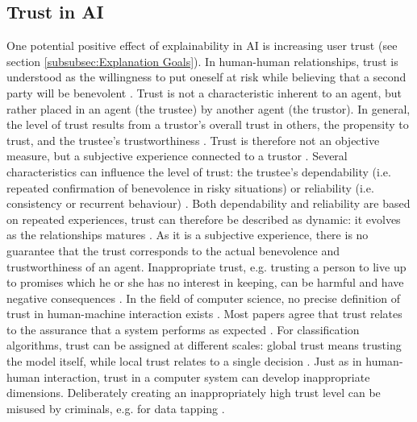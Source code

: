\subsection{Trust in AI}
One potential positive effect of explainability in AI is increasing user trust (see section \ref{subsubsec:Explanation Goals}). In human-human relationships, trust is understood as the willingness to put oneself at risk while believing that a second party will be benevolent \cite{rempel1985trust}. Trust is not a characteristic inherent to an agent, but rather placed in an agent (the trustee) by another agent (the trustor). In general, the level of trust results from a trustor's overall trust in others, the propensity to trust, and the trustee's trustworthiness \cite{mayer1995integrative}. Trust is therefore not an objective measure, but a subjective experience connected to a trustor \cite{bedi2006assessing, mohammadi2013trustworthiness}. Several characteristics can influence the level of trust: the trustee's dependability (i.e. repeated confirmation of benevolence in risky situations) or reliability (i.e. consistency or recurrent behaviour) \cite{rempel1985trust}. Both dependability and reliability are based on repeated experiences, trust can therefore be described as dynamic: it evolves as the relationships matures \cite{rempel1985trust}. As it is a subjective experience, there is no guarantee that the trust corresponds to the actual benevolence and trustworthiness of an agent. Inappropriate trust, e.g. trusting a person to live up to promises which he or she has no interest in keeping, can be harmful and have negative consequences \cite{van2001perceived}.\newline
In the field of computer science, no precise definition of trust in human-machine interaction exists \cite{artz2007survey}. Most papers agree that trust relates to the assurance that a system performs as expected \cite{mohammadi2013trustworthiness}. For classification algorithms, trust can be assigned at different scales: global trust means trusting the model itself, while local trust relates to a single decision \cite{ribeiro2016should}. Just as in human-human interaction, trust in a computer system can develop inappropriate dimensions. Deliberately creating an inappropriately high trust level can be misused by criminals, e.g. for data tapping \cite{mohammadi2013trustworthiness}.\newline


